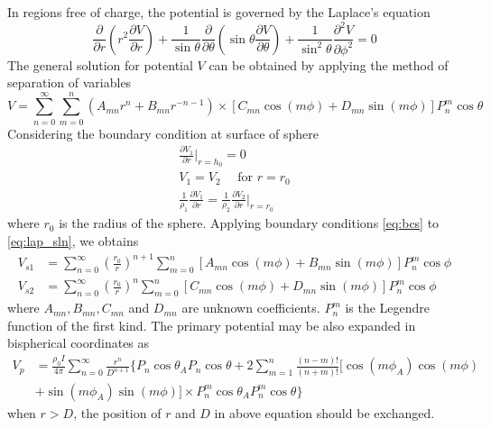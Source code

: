 \documentclass[11pt,letterpaper,leqno]{amsart}
\numberwithin{equation}{section}
\begin{document}
In regions free of charge, the potential is governed by the Laplace's equation
\begin{equation}\label{eq:laplace_eq}
\frac{\partial}{\partial r}(r^2\frac{\partial V}{\partial r}) + \frac{1}{\sin\theta}\frac{\partial}{\partial\theta}(\sin\theta\frac{\partial V}{\partial\theta}) + \frac{1}{\sin^2\theta}\frac{\partial^2 V}{\partial\phi^2} = 0
\end{equation}
The general solution for potential $V$ can be obtained by applying the method of separation of variables 
\begin{equation}\label{eq:lap_sln}
V = \sum\limits_{n=0}^\infty \sum\limits_{m=0}^n (A_{mn}r^n + B_{mn}r^{-n-1}) \times [C_{mn}\cos(m\phi) + D_{mn}\sin(m\phi)]P_n^m\cos\theta
\end{equation}
Considering the boundary condition at surface of sphere
\begin{subequations}
\begin{align}\label{eq:bcs}
\frac{\partial V_1}{\partial r}|_{r=h_0} = 0 \\
V_1 = V_2 \quad \text{ for } r = r_0 \\
\frac{1}{\rho_1}\frac{\partial V_1}{\partial r} = \frac{1}{\rho_2}\frac{\partial V_2}{\partial r}|_{r=r_0}
\end{align}
\end{subequations}
where $r_0$ is the radius of the sphere. Applying boundary conditions \eqref{eq:bcs} to \eqref{eq:lap_sln}, we obtains 
\begin{align}
V_{s1} &= \sum\limits_{n=0}^\infty(\frac{r_0}{r})^{n+1}\sum\limits_{m=0}^n [A_{mn}\cos(m\phi) + B_{mn}\sin(m\phi)]P_n^m \cos\phi \label{eq:sp1}\\
V_{s2} &=\sum\limits_{n=0}^\infty(\frac{r_0}{r})^{n}\sum\limits_{m=0}^n [C_{mn}\cos(m\phi) + D_{mn}\sin(m\phi)]P_n^m \cos\phi \label{eq:sp2}
\end{align}
where $A_{mn}, B_{mn}, C_{mn}$ and $D_{mn}$ are unknown coefficients. $P_n^m$ is the Legendre function of the first kind. The primary potential may be also expanded in bispherical coordinates as
\begin{equation}\label{eq:primary_p}
\begin{split}
V_p &= \frac{\rho_0I}{4\pi}\sum\limits_{n=0}^\infty\frac{r^n}{D^{n+1}}\{P_n\cos\theta_A P_n\cos\theta + 2\sum\limits_{m=1}^n\frac{(n-m)!}{(n+m)!}[\cos(m\phi_A)\cos(m\phi) \\
&+ \sin(m\phi_A)\sin(m\phi)] \times P_n^m\cos\theta_A P_n^m\cos\theta \}
\end{split}
\end{equation}
when $r > D$, the position of $r$ and $D$ in above equation should be exchanged.  
\end{document}
